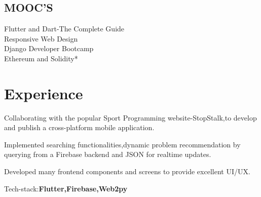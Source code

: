 \documentclass[]{deedy-resume-openfont}
\begin{document}
\begin{minipage}[t]{0.30\textwidth}
\subsection{MOOC'S}
Flutter and Dart-The Complete Guide \\
Responsive Web Design \\
Django Developer Bootcamp\\
Ethereum and Solidity*\\

%
%

\end{minipage} 
\hfill
\begin{minipage}[t]{0.69\textwidth} 


\section{Experience}

\location{}
\vspace{\topsep} %
\begin{tightemize}
\item Collaborating with the popular Sport Programming website-StopStalk,to develop and publish a cross-platform mobile application. 
\item Implemented searching functionalities,dynamic problem recommendation by querying from a Firebase backend and JSON for realtime updates.
\item Developed many frontend components and screens to provide excellent UI/UX.
\item Tech-stack:\textbf{Flutter,Firebase,Web2py}
\end{tightemize}

\end{minipage}
\end{document}
